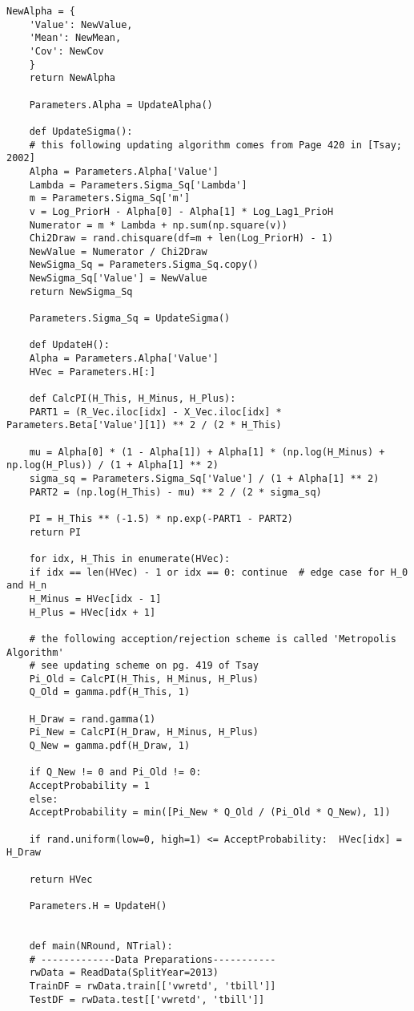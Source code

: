 \documentclass[letterpaper]{article}
\begin{document}
\begin{lstlisting}[label=lst:pythoncode]
	NewAlpha = {
	'Value': NewValue,
	'Mean': NewMean,
	'Cov': NewCov
	}
	return NewAlpha
	
	Parameters.Alpha = UpdateAlpha()
	
	def UpdateSigma():
	# this following updating algorithm comes from Page 420 in [Tsay; 2002]
	Alpha = Parameters.Alpha['Value']
	Lambda = Parameters.Sigma_Sq['Lambda']
	m = Parameters.Sigma_Sq['m']
	v = Log_PriorH - Alpha[0] - Alpha[1] * Log_Lag1_PrioH
	Numerator = m * Lambda + np.sum(np.square(v))
	Chi2Draw = rand.chisquare(df=m + len(Log_PriorH) - 1)
	NewValue = Numerator / Chi2Draw
	NewSigma_Sq = Parameters.Sigma_Sq.copy()
	NewSigma_Sq['Value'] = NewValue
	return NewSigma_Sq
	
	Parameters.Sigma_Sq = UpdateSigma()
	
	def UpdateH():
	Alpha = Parameters.Alpha['Value']
	HVec = Parameters.H[:]
	
	def CalcPI(H_This, H_Minus, H_Plus):
	PART1 = (R_Vec.iloc[idx] - X_Vec.iloc[idx] * Parameters.Beta['Value'][1]) ** 2 / (2 * H_This)
	
	mu = Alpha[0] * (1 - Alpha[1]) + Alpha[1] * (np.log(H_Minus) + np.log(H_Plus)) / (1 + Alpha[1] ** 2)
	sigma_sq = Parameters.Sigma_Sq['Value'] / (1 + Alpha[1] ** 2)
	PART2 = (np.log(H_This) - mu) ** 2 / (2 * sigma_sq)
	
	PI = H_This ** (-1.5) * np.exp(-PART1 - PART2)
	return PI
	
	for idx, H_This in enumerate(HVec):
	if idx == len(HVec) - 1 or idx == 0: continue  # edge case for H_0 and H_n
	H_Minus = HVec[idx - 1]
	H_Plus = HVec[idx + 1]
	
	# the following acception/rejection scheme is called 'Metropolis Algorithm'
	# see updating scheme on pg. 419 of Tsay
	Pi_Old = CalcPI(H_This, H_Minus, H_Plus)
	Q_Old = gamma.pdf(H_This, 1)
	
	H_Draw = rand.gamma(1)
	Pi_New = CalcPI(H_Draw, H_Minus, H_Plus)
	Q_New = gamma.pdf(H_Draw, 1)
	
	if Q_New != 0 and Pi_Old != 0:
	AcceptProbability = 1
	else:
	AcceptProbability = min([Pi_New * Q_Old / (Pi_Old * Q_New), 1])
	
	if rand.uniform(low=0, high=1) <= AcceptProbability:  HVec[idx] = H_Draw
	
	return HVec
	
	Parameters.H = UpdateH()
	
	
	def main(NRound, NTrial):
	# -------------Data Preparations-----------
	rwData = ReadData(SplitYear=2013)
	TrainDF = rwData.train[['vwretd', 'tbill']]
	TestDF = rwData.test[['vwretd', 'tbill']]
	

\end{lstlisting}
\end{document}

